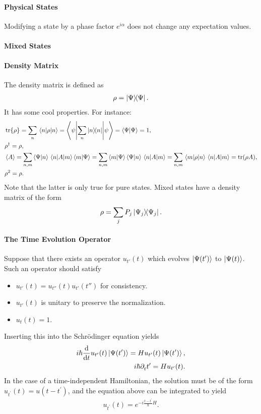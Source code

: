 \paragraph{Physical States}
Modifying a state by a phase factor $e^{i\alpha}$ does not change any expectation values.

\paragraph{Mixed States}

\paragraph{Density Matrix}
The density matrix is defined as
\begin{align*}
	\rho = \op{\Psi}{\Psi}.
\end{align*}
It has some cool properties. For instance:
\begin{align*}
	&\tr{\rho} = \sum\limits_{n}\expval{\rho}{n} = \ev**{\sum\limits_{n}\op{n}{n}}{\psi} = \braket{\Psi} = 1, \\
	&\adj{\rho} = \rho, \\
	&\expval{A} = \sum\limits_{n, m}\braket{\Psi}{n}\mel{n}{A}{m}\braket{m}{\Psi} = \sum\limits_{n, m}\braket{m}{\Psi}\braket{\Psi}{n}\mel{n}{A}{m} = \sum\limits_{n, m}\mel{m}{\rho}{n}\mel{n}{A}{m} = \tr(\rho A), \\
	&\rho^{2} = \rho.
\end{align*}
Note that the latter is only true for pure states. Mixed states have a density matrix of the form
\begin{align*}
	\rho = \sum\limits_{j}P_{j}\op{\Psi_{j}}{\Psi_{j}}.
\end{align*}

\paragraph{The Time Evolution Operator}
Suppose that there exists an operator $u_{t'}(t)$ which evolves $\ket{\Psi(t')}$ to $\ket{\Psi(t)}$. Such an operator should satisfy
\begin{itemize}
	\item $u_{t'}(t) = u_{t''}(t)u_{t'}(t'')$ for consistency.
	\item $u_{t'}(t)$ is unitary to preserve the normalization.
	\item $u_{t}(t) = 1$.
\end{itemize}
Inserting this into the Schrödinger equation yields
\begin{align*}
	i\hbar\dv{t}u_{t^{\prime}}(t)\ket{\Psi(t^{\prime})} = Hu_{t^{\prime}}(t)\ket{\Psi(t^{\prime})}, \\
	i\hbar\partial_{t}^{}t^{\prime} = Hu_{t^{\prime}}(t).
\end{align*}
In the case of a time-independent Hamiltonian, the solution must be of the form $u_{t^{\prime}}(t) = u(t - t^{\prime})$, and the equation above can be integrated to yield
\begin{align*}
	u_{t^{\prime}}(t) = e^{-i\frac{t - t^{\prime}}{\hbar}H}.
\end{align*}

